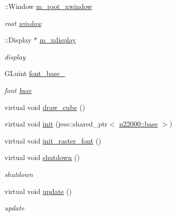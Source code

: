 \begin{DoxyCompactItemize}
::Window \hyperlink{classnebula_1_1platform_1_1renderer_1_1gl_1_1glx_1_1base_aeeeefc0c87375715e1c863cdbbc85888}{m\_\-root\_\-xwindow}
\begin{DoxyCompactList}\small\item\em root \hyperlink{namespacenebula_1_1platform_1_1window}{window} \item\end{DoxyCompactList}\item 
::Display $\ast$ \hyperlink{classnebula_1_1platform_1_1renderer_1_1gl_1_1glx_1_1base_ac2ab137d52f0925714efeccb04dcc69d}{m\_\-xdisplay}
\begin{DoxyCompactList}\small\item\em display \item\end{DoxyCompactList}\item 
GLuint \hyperlink{classnebula_1_1platform_1_1renderer_1_1gl_1_1glx_1_1base_a4b22e4309d1238b47127d2bec9fb6138}{font\_\-base\_\-}
\begin{DoxyCompactList}\small\item\em font \hyperlink{classnebula_1_1platform_1_1renderer_1_1gl_1_1glx_1_1base}{base} \item\end{DoxyCompactList}\item 
virtual void \hyperlink{classnebula_1_1platform_1_1renderer_1_1gl_1_1glx_1_1base_af6bfad8ac789393e50da7f32ea45817e}{draw\_\-cube} ()
\item 
virtual void \hyperlink{classnebula_1_1platform_1_1renderer_1_1gl_1_1glx_1_1base_a08357ff32222b7e316db783de5755a2e}{init} (jess::shared\_\-ptr$<$ \hyperlink{classnebula_1_1platform_1_1window_1_1base}{n22000::base} $>$)
\item 
virtual void \hyperlink{classnebula_1_1platform_1_1renderer_1_1gl_1_1glx_1_1base_a36d7ae28f7c0c727e45ee36a48160928}{init\_\-raster\_\-font} ()
\item 
virtual void \hyperlink{classnebula_1_1platform_1_1renderer_1_1gl_1_1glx_1_1base_ac6647cc66f798bbf9d500b8f4254cd94}{shutdown} ()
\begin{DoxyCompactList}\small\item\em shutdown \item\end{DoxyCompactList}\item 
virtual void \hyperlink{classnebula_1_1platform_1_1renderer_1_1gl_1_1glx_1_1base_a7d641192feb417180195053cd58dcf7d}{update} ()
\begin{DoxyCompactList}\small\item\em update \item\end{DoxyCompactList}\item 

\end{DoxyCompactItemize}
